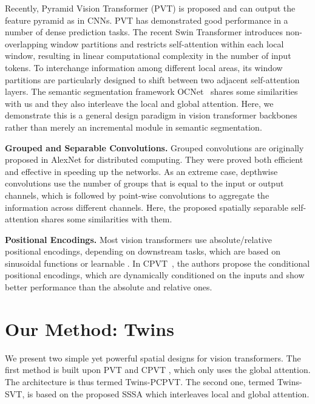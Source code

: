 \documentclass{article}
\def \ours          {Twins}
\def \altour   {Twins-SVT}
\def \pcpvt  {Twins-PCPVT}
\begin{document}
Recently, Pyramid Vision Transformer (PVT) \cite{wang2021pyramid} is proposed and can output the feature pyramid \cite{lin2017feature} as in CNNs. PVT has demonstrated good 
performance in a number of dense prediction tasks. The recent 
Swin Transformer \cite{liu2021swin} introduces non-overlapping window partitions and restricts self-attention within each local window, resulting in linear computational complexity in the number of input tokens. To interchange information among different local areas, its window partitions are particularly designed 
to shift between two adjacent self-attention layers. The semantic segmentation framework OCNet~\cite{OCNet2021} shares some similarities with us and they also interleave the local and global attention. Here, we demonstrate this is a general design paradigm in vision transformer backbones rather than merely an incremental module in semantic segmentation.




\textbf{Grouped and Separable Convolutions.} Grouped convolutions are originally proposed in AlexNet \cite{krizhevsky2012imagenet} for distributed computing.
They were 
proved both efficient and effective in speeding up the networks. As an extreme case, depthwise convolutions \cite{chollet2017xception,sifre2014rigid} use the number of groups that is equal to the input or output channels, which is followed by point-wise convolutions to aggregate the information across 
different channels. Here, the proposed spatially separable self-attention shares some similarities with them. 


\textbf{Positional Encodings.}
Most vision transformers use absolute/relative positional encodings, depending on 
downstream tasks, which are based on sinusoidal functions \cite{vaswani2017attention} or learnable \cite{dosovitskiy2021an,touvron2020training}. In CPVT~\cite{chu2021ConditionalPE}, the authors propose the conditional positional encodings, which are dynamically conditioned on the inputs and show better performance than the absolute and relative ones.

\section{Our Method: \ours}
We present two simple yet powerful spatial designs for vision transformers. The
first method 
is built  upon 
PVT \cite{wang2021pyramid} and CPVT \cite{chu2021ConditionalPE}, which only uses the global attention. The architecture is thus termed 
\pcpvt. The second 
one, termed 
\altour, is based on the proposed SSSA which interleaves local and global attention.
\end{document}
